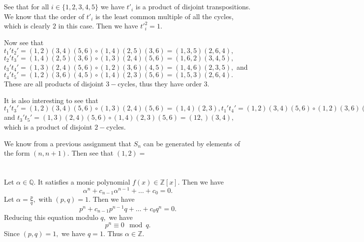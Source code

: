 \documentclass{article}
\title{} %
\author{Gandhar Kulkarni (mmat2304)} %
\date{} %
\begin{document}
 
\maketitle %


\section{} %
\section{} %
See that for all $i \in \{1,2,3,4,5\}$ we have $t'_i$ is a product of disjoint transpositions. We know that the order of $t'_i$ is the least common multiple 
of all the cycles, which is clearly $2$ in this case. Then we have ${t'}_i^2=1.$

Now see that $t_1't_2'= (1 ,2)(3 ,4)(5 ,6)\circ (1 ,4)(2, 5)(3, 6)=(1 ,3 ,5)(2, 6 ,4),$ $t_2't_3'=(1 ,4)(2, 5)(3, 6) \circ (1, 3)(2, 4)(5, 6)=(1, 6 ,2)(3, 
4, 5),$
$t_3't_4'= (1, 3)(2 ,4)(5 ,6) \circ (1, 2) (3, 6) (4, 5)=(1 ,4 ,6)(2, 3 ,5),$ and $t_4' t_5'= (1, 2) (3, 6) (4, 5) \circ (1, 4)(2, 3)(5, 6)=(1 ,5, 3)(2, 6, 
4).$ These are all 
products of disjoint $3-$cycles, thus they have order $3.$ 

It is also interesting to see that $t_1't_3'=(1 ,2)(3, 4)(5, 6)\circ (1, 3)(2, 4)(5 ,6)=(1 ,4)(2 ,3), t_1't_4'=(1 ,2)(3, 4)(5, 6)\circ (1 ,2) (3, 6) (4 ,5)= 
(3, 5 )(4 ,6), 
t_1't_5'=(1 ,2)(3, 4)(5, 6)\circ (1 ,4)(2, 3)(5, 6)= (1, 3)(2, 4), t_2't_4'=(1, 4)(2 ,5)(3, 6) \circ (1, 2) (3, 6) (4 ,5)=(1, 5)(2, 4), t_2't_5'=(1, 4)(2, 
5)(3, 6) \circ (1, 
4)(2, 3)(5 ,6)= (2 ,6)(3, 5),$ and $t_3't_5'= (1 ,3)(2, 4)(5, 6) \circ  (1 ,4)(2, 3)(5, 6)=(1 2,)(3, 4),$ which is a product of disjoint $2-$cycles. 

We know from a previous assignment that $S_n$ can be generated by elements of the form $(n, n+1).$ Then see that $(1,2)= $
\section{} %
Let $\alpha \in \mathbb{Q}.$ It satisfies a monic polynomial $f(x) \in \mathbb{Z}[x].$ Then we have $$\alpha^n + c_{n-1}\alpha^{n-1} + \dots + c_0=0.$$
Let $\alpha=\frac{p}{q},$ with $(p,q)=1.$ Then we have $$p^n + c_{n-1}p^{n-1}q + \dots + c_0q^n=0.$$ Reducing this equation modulo $q,$ we have 
$$p^n \equiv 0 \mod q.$$ Since $(p,q)=1,$ we have $q=1.$ Thus $\alpha \in \mathbb{Z}.$
\end{document}
